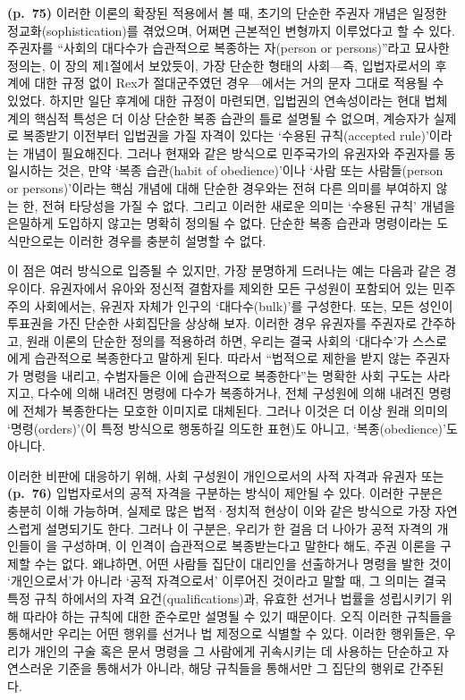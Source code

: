 \textbf{(p.~75)} 이러한 이론의 확장된 적용에서 볼 때, 초기의 단순한
주권자 개념은 일정한 정교화(sophistication)를 겪었으며, 어쩌면 근본적인
변형까지 이루었다고 할 수 있다. 주권자를 ``사회의 대다수가 습관적으로
복종하는 자(person or persons)''라고 묘사한 정의는, 이 장의 제1절에서
보았듯이, 가장 단순한 형태의 사회---즉, 입법자로서의 후계에 대한 규정
없이 Rex가 절대군주였던 경우---에서는 거의 문자 그대로 적용될 수 있었다.
하지만 일단 후계에 대한 규정이 마련되면, 입법권의 연속성이라는 현대
법체계의 핵심적 특성은 더 이상 단순한 복종 습관의 틀로 설명될 수 없으며,
계승자가 실제로 복종받기 이전부터 입법권을 가질 자격이 있다는 `수용된
규칙(accepted rule)'이라는 개념이 필요해진다. 그러나 현재와 같은
방식으로 민주국가의 유권자와 주권자를 동일시하는 것은, 만약 `복종
습관(habit of obedience)'이나 `사람 또는 사람들(person or
persons)'이라는 핵심 개념에 대해 단순한 경우와는 전혀 다른 의미를
부여하지 않는 한, 전혀 타당성을 가질 수 없다. 그리고 이러한 새로운
의미는 `수용된 규칙' 개념을 은밀하게 도입하지 않고는 명확히 정의될 수
없다. 단순한 복종 습관과 명령이라는 도식만으로는 이러한 경우를 충분히
설명할 수 없다.

이 점은 여러 방식으로 입증될 수 있지만, 가장 분명하게 드러나는 예는
다음과 같은 경우이다. 유권자에서 유아와 정신적 결함자를 제외한 모든
구성원이 포함되어 있는 민주주의 사회에서는, 유권자 자체가 인구의
`대다수(bulk)'를 구성한다. 또는, 모든 성인이 투표권을 가진 단순한
사회집단을 상상해 보자. 이러한 경우 유권자를 주권자로 간주하고, 원래
이론의 단순한 정의를 적용하려 하면, 우리는 결국 사회의 `대다수'가
스스로에게 습관적으로 복종한다고 말하게 된다. 따라서 ``법적으로 제한을
받지 않는 주권자가 명령을 내리고, 수범자들은 이에 습관적으로
복종한다''는 명확한 사회 구도는 사라지고, 다수에 의해 내려진 명령에
다수가 복종하거나, 전체 구성원에 의해 내려진 명령에 전체가 복종한다는
모호한 이미지로 대체된다. 그러나 이것은 더 이상 원래 의미의
`명령(orders)'(이 특정 방식으로 행동하길 의도한
표현)도 아니고, `복종(obedience)'도 아니다.

이러한 비판에 대응하기 위해, 사회 구성원이 개인으로서의 사적 자격과
유권자 또는 \textbf{(p.~76)} 입법자로서의 공적 자격을 구분하는 방식이
제안될 수 있다. 이러한 구분은 충분히 이해 가능하며, 실제로 많은
법적·정치적 현상이 이와 같은 방식으로 가장 자연스럽게 설명되기도 한다.
그러나 이 구분은, 우리가 한 걸음 더 나아가 공적 자격의 개인들이
을 구성하며, 이 인격이 습관적으로
복종받는다고 말한다 해도, 주권 이론을 구제할 수는 없다. 왜냐하면, 어떤
사람들 집단이 대리인을 선출하거나 명령을 발한 것이 `개인으로서'가 아니라
`공적 자격으로서' 이루어진 것이라고 말할 때, 그 의미는 결국 특정 규칙
하에서의 자격 요건(qualifications)과, 유효한 선거나 법률을 성립시키기
위해 따라야 하는 규칙에 대한 준수로만 설명될 수 있기 때문이다. 오직
이러한 규칙들을 통해서만 우리는 어떤 행위를 선거나 법 제정으로 식별할 수
있다. 이러한 행위들은, 우리가 개인의 구술 혹은 문서 명령을 그 사람에게
귀속시키는 데 사용하는 단순하고 자연스러운 기준을 통해서가 아니라, 해당
규칙들을 통해서만 그 집단의 행위로 간주된다.

